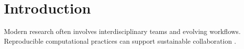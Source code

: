 

\section{Introduction}
Modern research often involves interdisciplinary teams and evolving workflows.
Reproducible computational practices can support sustainable collaboration 
\cite{wilson2014best}.
